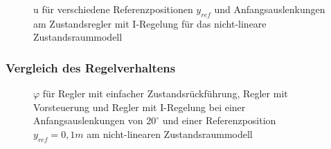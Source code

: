 \begin{figure}[H]
    \centering
    \caption[u für Regler mit I-Regelung (nicht-linear)]{u für verschiedene Referenzpositionen $y_{ref}$ und Anfangsauslenkungen am Zustandsregler mit I-Regelung für das nicht-lineare Zustandsraummodell}
    \label{fig:Bild39}
\end{figure}

\subsubsection{Vergleich des Regelverhaltens}

\begin{figure}[H]
    \centering
    \caption[Reglervergleich für $\varphi$ (nicht-linear)]{$\varphi$ für Regler mit einfacher Zustandsrückführung, Regler mit Vorsteuerung und Regler mit I-Regelung bei einer Anfangsauslenkungen von $20^\circ$ und einer Referenzposition $y_{ref} = 0,1 m$ am nicht-linearen Zustandsraummodell}
    \label{fig:Bild40}
\end{figure}

